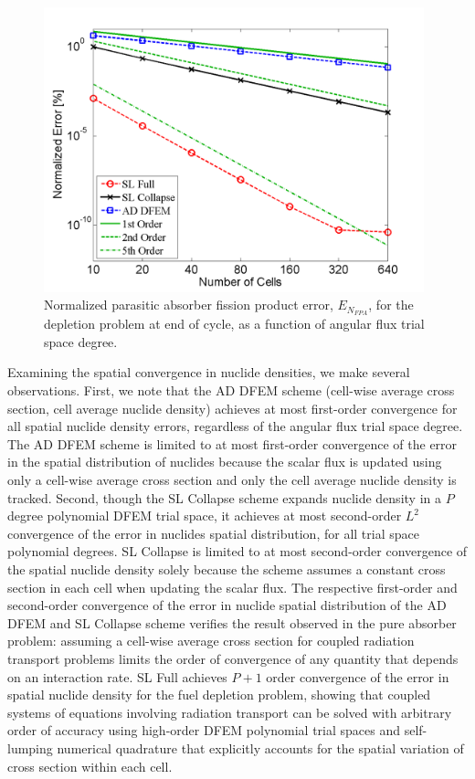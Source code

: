 \begin{figure}[!hbp]
\centering
\includegraphics[width=11cm]{chapter5_depletion/FPA_P4_norm_err.png}
\caption{Normalized parasitic absorber fission product error, $E_{N_{FPA}}$, for the depletion problem at end of cycle, as a function of angular flux trial space degree.}
\label{fig:depletion_NFPA_p4}
\end{figure}  
Examining the spatial convergence in nuclide densities, we make several observations.  
First, we note that the AD DFEM scheme (cell-wise average cross section, cell average nuclide density) achieves at most first-order convergence for all spatial nuclide density errors, regardless of the angular flux trial space degree.  
The AD DFEM scheme is limited to at most first-order convergence of the error in the spatial distribution of nuclides because the scalar flux is updated using only a cell-wise average cross section and only the cell average nuclide density is tracked.
Second, though the SL Collapse scheme expands nuclide density in a $P$ degree polynomial DFEM trial space, it achieves at most second-order $L^2$ convergence of the error in nuclides spatial distribution, for all trial  space polynomial degrees.  
SL Collapse is limited to at most second-order convergence of the spatial nuclide density solely because the scheme assumes a constant cross section in each cell when updating the scalar flux.  
The respective first-order and second-order convergence of the error in nuclide spatial distribution of the AD DFEM and SL Collapse scheme verifies the result observed in the pure absorber problem: assuming a cell-wise average cross section for coupled radiation transport problems limits the order of convergence of any quantity that depends on an interaction rate.
SL Full achieves $P+1$ order convergence of the error in spatial nuclide density for the fuel depletion problem, showing that coupled systems of equations involving radiation transport can be solved with arbitrary order of accuracy using high-order DFEM polynomial trial spaces and self-lumping numerical quadrature that explicitly accounts for the spatial variation of cross section within each cell.

